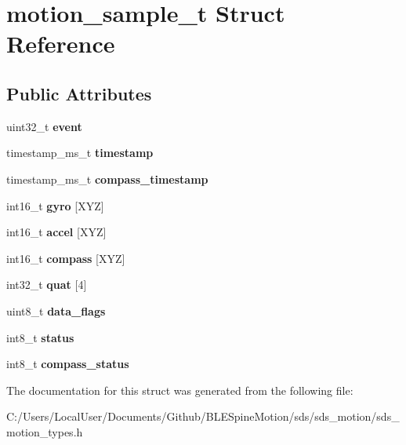 \hypertarget{structmotion__sample__t}{}\section{motion\+\_\+sample\+\_\+t Struct Reference}
\label{structmotion__sample__t}
\subsection*{Public Attributes}
\begin{DoxyCompactItemize}
\item 
\mbox{\label{structmotion__sample__t_a7b129e86a656825fbedf73076badfbac}} 
uint32\+\_\+t {\bfseries event}
\item 
\mbox{\label{structmotion__sample__t_a1ab6d9b375fdab3f4aeb8dc2f71fbb3c}} 
timestamp\+\_\+ms\+\_\+t {\bfseries timestamp}
\item 
\mbox{\label{structmotion__sample__t_a4a2ced97f49fc227f365d5d56893bc7f}} 
timestamp\+\_\+ms\+\_\+t {\bfseries compass\+\_\+timestamp}
\item 
\mbox{\label{structmotion__sample__t_aff4579e746e280eaad67e65ab1bf2f08}} 
int16\+\_\+t {\bfseries gyro} \mbox{[}X\+YZ\mbox{]}
\item 
\mbox{\label{structmotion__sample__t_a6bc89468d97575cdc91b9657e273d27f}} 
int16\+\_\+t {\bfseries accel} \mbox{[}X\+YZ\mbox{]}
\item 
\mbox{\label{structmotion__sample__t_a28cb3084b13b5e70599e87a271b92cc6}} 
int16\+\_\+t {\bfseries compass} \mbox{[}X\+YZ\mbox{]}
\item 
\mbox{\label{structmotion__sample__t_a736eb510b3730462608043cbbee878e0}} 
int32\+\_\+t {\bfseries quat} \mbox{[}4\mbox{]}
\item 
\mbox{\label{structmotion__sample__t_acd8473b1afbbdf8705fd542076372bc9}} 
uint8\+\_\+t {\bfseries data\+\_\+flags}
\item 
\mbox{\label{structmotion__sample__t_a786fc9cc51a8c1657aecbc8397406432}} 
int8\+\_\+t {\bfseries status}
\item 
\mbox{\label{structmotion__sample__t_ab0490eb65cbe23d050ee4fb203ad73e4}} 
int8\+\_\+t {\bfseries compass\+\_\+status}
\end{DoxyCompactItemize}


The documentation for this struct was generated from the following file\+:\begin{DoxyCompactItemize}
\item 
C\+:/\+Users/\+Local\+User/\+Documents/\+Github/\+B\+L\+E\+Spine\+Motion/sds/sds\+\_\+motion/sds\+\_\+motion\+\_\+types.\+h\end{DoxyCompactItemize}
